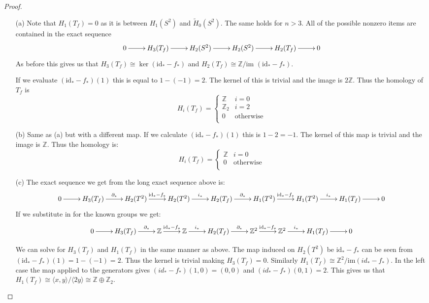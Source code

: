 \documentclass[10pt]{article}
\newcommand{\bb}[1]{\mathbb{#1}}
\newcommand{\rH}{\widetilde{H}}
\newcommand{\id}{\mathrm{id}}
\theoremstyle{plain}
\theoremstyle{remark}
\begin{document}
\begin{proof}
  \begin{enumerate}
  \item[(a)] Note that $H_1(T_f)=0$ as it is between $H_1(S^2)$ and $\rH_0(S^2)$.
    The same holds for $n>3$. All of the possible nonzero items are contained
    in the exact sequence
    \[
      \xymatrix{
        0\ar[r] & H_3(T_f) \ar[r] & H_2(S^2) \ar[r] & H_2(S^2) \ar[r] & H_2(T_f) \ar[r] & 0
      }
    \]
    As before this gives us that $H_3(T_f)\cong \ker (\id_*-f_*)$ and
    $H_2(T_f)\cong \bb{Z}/\text{im\ }(\id_*-f_*)$.

    If we evaluate $(\id_*-f_*)(1)$ this is equal to $1-(-1)=2$.
    The kernel of this is trivial and the image is $2\bb{Z}$. Thus the
    homology of $T_f$ is
    \[
      H_i(T_f) =
      \left\{
        \begin{array}{cr}
          \bb{Z} & i=0\\
          \bb{Z}_2 & i=2\\
          0 & \text{otherwise}\\
        \end{array}
      \right.
    \]
  \item[(b)] Same as (a) but with a different map. If we calculate $(\id_*-f_*)(1)$
    this is $1-2=-1$. The kernel of this map is trivial and the image is $\bb{Z}$. Thus
    the homology is:
    \[
      H_i(T_f) =
      \left\{
        \begin{array}{cr}
          \bb{Z} & i=0\\
          0 & \text{otherwise}\\
        \end{array}
      \right.
    \]
  \item[(c)]
    The exact sequence we get from the long exact sequence above is:
    \[
      \xymatrix{
        0 \ar[r] & H_3(T_f) \ar[r]^-{\partial_*} & H_2(T^2)\ar[r]^-{\id_*-f_*} & H_2(T^2) \ar[r]^-{i_*} & H_2(T_f) \ar[r]^-{\partial_*} & H_1(T^2) \ar[r]^-{\id_*-f_*} & H_1(T^2) \ar[r]^-{i_*} & H_1(T_f) \ar[r] & 0
      }
    \]
    If we substitute in for the known groups we get:
    \[
      \xymatrix{
        0 \ar[r] & H_3(T_f) \ar[r]^-{\partial_*} & \bb{Z} \ar[r]^-{\id_*-f_*} & \bb{Z} \ar[r]^-{i_*} & H_2(T_f) \ar[r]^-{\partial_*} & \bb{Z}^2 \ar[r]^-{\id_*-f_*} & \bb{Z}^2 \ar[r]^-{i_*} & H_1(T_f) \ar[r] & 0
      }
    \]

    We can solve for $H_3(T_f)$ and $H_1(T_f)$ in the same manner as above.
    The map induced on $H_2(T^2)$ be $\id_*-f_*$ can be seen from
    $(\id_*-f_*)(1)=1-(-1)=2$. Thus the kernel is trivial making
    $H_3(T_f)=0$. Similarly $H_1(T_f)\cong\bb{Z}^2/\text{im}(id_*-f_*)$. In the
    left case the map applied to the generators gives $(id_*-f_*)(1,0)=(0,0)$
    and $(id_*-f_*)(0,1)=2$. This gives us that $H_1(T_f)\cong\langle x,y\rangle/\langle 2y\rangle\cong \bb{Z}\oplus\bb{Z}_2$.


\end{enumerate}
\end{proof}
\end{document}
